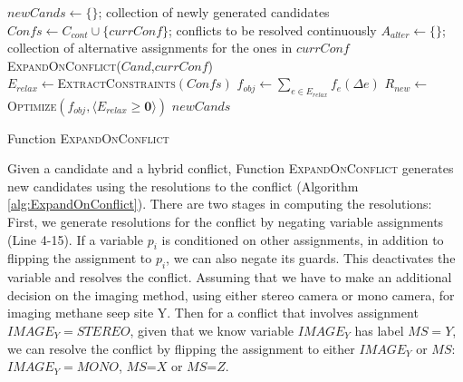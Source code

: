\documentclass[jair,twoside,11pt,theapa]{article}
\let\oldnl\nl%
\newcommand{\nonl}{\renewcommand{\nl}{\let\nl\oldnl}}%
\begin{document}
\begin{algorithm}[h!]
	\SetAlgoLined
	\Indm
	\Initialize{}
	\Indp
	{$\mathit{newCands}\leftarrow \{\}$}; collection of newly generated candidates\;
	{$\mathit{Confs}\leftarrow C_{cont}\cup \{\mathit{currConf}\}$; conflicts to be resolved
		continuously}\;
	{$A_{alter}\leftarrow \{\}$}; collection of alternative assignments for the ones in $\mathit{currConf}$\;
	\Indm
	\Algorithm{}
	\nonl\textsc{ExpandOnConflict}($\mathit{Cand}$,$\mathit{currConf}$)\\
	\Indp
	$E_{relax}\leftarrow$\textsc{ExtractConstraints}$(\mathit{Confs})$\;
	$f_{obj}\leftarrow\sum_{e\in E_{relax}}f_e(\Delta e)$\;
	$R_{new}\leftarrow$\textsc{Optimize}$(f_{obj},\langle
	E_{relax}\geq \textbf{0}\rangle )$\;
	\Return $\mathit{newCands}$\;
	\caption{Function \textsc{ExpandOnConflict}}
	\label{alg:ExpandOnConflict}
\end{algorithm}



Given a candidate and a hybrid conflict, Function \textsc{ExpandOnConflict} generates
new candidates using the resolutions to the conflict (Algorithm
\ref{alg:ExpandOnConflict}). There are two stages in computing the resolutions:
First, we generate resolutions for the conflict by negating variable assignments
(Line 4-15). If a variable $p_i$ is conditioned on other assignments, in
addition to flipping the assignment to $p_i$, we can also negate its guards. This
deactivates the variable and resolves the conflict. Assuming that we have to make an additional decision on the imaging method, using either stereo camera or mono camera, for imaging methane seep site Y. Then for a conflict that involves assignment $\mathit{IMAGE_Y=STEREO}$, given that we know variable $\mathit{IMAGE_Y}$ has label $MS=Y$, we can resolve the conflict by flipping the assignment to either $\mathit{IMAGE_Y}$ or $MS$: $\mathit{IMAGE_Y=MONO}$, $MS$=$X$ or $MS$=$Z$.
\end{document}
